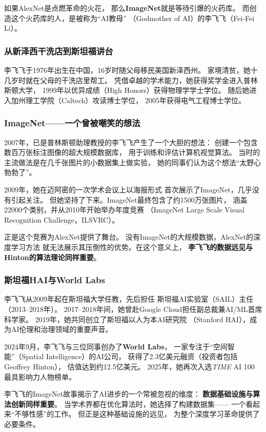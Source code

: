 如果AlexNet是点燃革命的火花，
那么\textbf{ImageNet}就是等待引爆的火药库。
而创造这个火药库的人，是被称为``AI教母''
（Godmother of AI）的李飞飞（Fei-Fei Li）。

\subsubsection{从新泽西干洗店到斯坦福讲台}
李飞飞于1976年出生在中国，16岁时随父母移民美国新泽西州。
家境清贫，她十几岁时就在父母的干洗店里帮工。
凭借卓越的学术能力，她获得奖学金进入普林斯顿大学，
1999年以优异成绩（High Honors）获得物理学学士学位。
随后她进入加州理工学院（Caltech）攻读博士学位，
2005年获得电气工程博士学位。

\subsubsection{ImageNet——一个曾被嘲笑的想法}
2007年，已是普林斯顿助理教授的李飞飞产生了一个大胆的想法：
创建一个包含数百万张标注图像的超大规模数据库，
用于训练和评估计算机视觉算法。
当时的主流做法是在几千张图片的小数据集上做实验，
她的同事们认为这个想法``太野心勃勃了''。

2009年，她在迈阿密的一次学术会议上以海报形式
首次展示了ImageNet，几乎没有引起关注。
但她坚持了下来。ImageNet最终包含了约1500万张图片，
涵盖22000个类别，并从2010年开始举办年度竞赛
（ImageNet Large Scale Visual Recognition Challenge，ILSVRC）。

正是这个竞赛为AlexNet提供了舞台。
没有ImageNet的大规模数据，AlexNet的深度学习方法
就无法展示其压倒性的优势。在这个意义上，
\textbf{李飞飞的数据远见与Hinton的算法理论同样重要}。

\subsubsection{斯坦福HAI与World Labs}
李飞飞从2009年起在斯坦福大学任教，先后担任
斯坦福AI实验室（SAIL）主任（2013--2018年）。
2017--2018年间，她曾赴Google Cloud担任副总裁兼AI/ML首席科学家。
2019年，她共同创立了斯坦福以人为本AI研究院
（Stanford HAI），成为AI伦理和治理领域的重要声音。

2024年9月，李飞飞与三位同事创办了\textbf{World Labs}，
一家专注于``空间智能''（Spatial Intelligence）的AI公司，
获得了2.3亿美元融资（投资者包括Geoffrey Hinton），
估值达到约12.5亿美元。
2025年，她再次入选\textit{TIME} AI 100
最具影响力人物榜单。

\begin{keybox}
李飞飞的ImageNet故事揭示了AI进步的一个常被忽视的维度：
\textbf{数据基础设施与算法创新同样重要}。
当学术界都在优化算法时，她选择了构建数据集——
一个看起来``不够性感''的工作。
但正是这种基础设施的远见，
为整个深度学习革命提供了必要条件。
\end{keybox}


